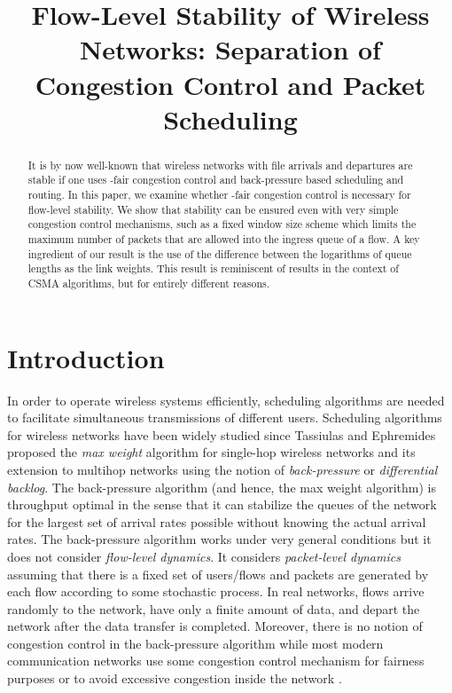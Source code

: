 \documentclass[10pt,onecolumn,draftclsnofoot,journal]{IEEEtran}
\begin{document}
\title{Flow-Level Stability of Wireless Networks: Separation of Congestion Control and Packet Scheduling}
\author{
}

\maketitle
\begin{abstract}
It is by now well-known that wireless networks with file arrivals and departures are stable if one uses -fair congestion control and back-pressure based scheduling and routing. In this paper, we examine whether -fair congestion control is necessary for flow-level stability. We show that stability can be ensured even with very simple congestion control mechanisms, such as a fixed window size scheme which limits the maximum number of packets that are allowed into the ingress queue of a flow. A key ingredient of our result is the use of the difference between the logarithms of queue lengths as the link weights. This result is reminiscent of results in the context of CSMA algorithms, but for entirely different reasons.
\end{abstract}

\section{Introduction}\label{sec:intro}
In order to operate wireless systems efficiently, scheduling algorithms are needed to facilitate simultaneous transmissions of different users.
Scheduling algorithms for wireless networks have been widely studied since Tassiulas and Ephremides \cite{eph}
proposed the \textit{max weight} algorithm for single-hop wireless networks and its extension to multihop networks using the notion of \textit{back-pressure} or \textit{differential backlog}. The back-pressure algorithm (and hence, the max weight algorithm)
is throughput optimal in the sense that it can stabilize
the queues of the network for the largest set of arrival rates possible without knowing the actual arrival rates. The back-pressure algorithm works under very general
conditions but it does not consider \textit{flow-level dynamics}. It considers \textit{packet-level dynamics} assuming that there is a fixed set of
users/flows and packets are generated by each flow according to some stochastic process. In real networks, flows arrive randomly to the network, have only a finite amount of data, and
depart the network after the data transfer is completed.
Moreover, there is no notion of congestion control in the back-pressure algorithm while most modern
communication networks use some congestion control mechanism for fairness purposes or to avoid excessive congestion inside the network \cite{LNS08}.
\end{document}
